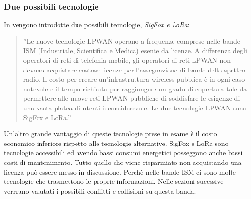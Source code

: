 \documentclass[a4paper]{report} %
\begin{document}
\subsubsection{Due possibili tecnologie}
In \cite{art:rif.23} vengono introdotte due possibili tecnologie, \textit{SigFox e LoRa}: 
\begin{quote}
	''Le nuove tecnologie LPWAN operano a frequenze comprese nelle bande ISM (Industriale, Scientifica e Medica) esente da licenze. A differenza degli operatori di reti di telefonia mobile, gli operatori di reti LPWAN non devono acquistare costose licenze per l'assegnazione di bande dello spettro radio. Il costo per creare un'infrastruttura wireless pubblica è in ogni caso notevole e il tempo richiesto per raggiungere un grado di copertura tale da permettere alle nuove reti LPWAN pubbliche di soddisfare le esigenze di una vasta platea di utenti è considerevole. Le due tecnologie LPWAN sono SigFox e LoRa.''
\end{quote}
Un'altro grande vantaggio di queste tecnologie prese in esame è il costo economico inferiore rispetto alle tecnologie alternative. SigFox e LoRa sono tecnologie accessibili ed avendo bassi consumi energetici posseggono anche bassi costi di mantenimento. Tutto quello che viene risparmiato non acquistando una licenza può essere messo in discussione. Perchè nelle bande ISM ci sono molte tecnologie che trasmettono le proprie informazioni. Nelle sezioni sucessive verrrano valutati i possibili conflitti e collisioni su questa banda.
\end{document}
